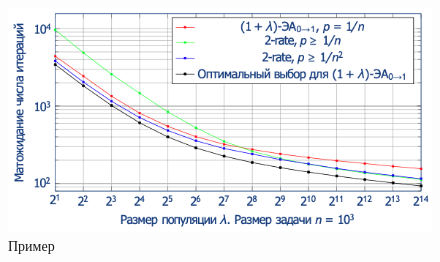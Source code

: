 \begin{figure}[h]
    \centering
    \includegraphics[width=0.8\linewidth]{images/c33_2rate.png}
    \caption{Пример}
    \label{fig:mpr}
\end{figure}
    